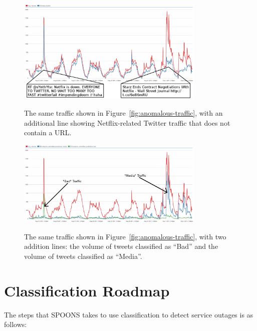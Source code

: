 \documentclass[12pt]{ucthesis}
\newcommand{\captionfonts}{\small\bf\ssp}
\begin{document}
\begin{figure}
   \begin{center}
      \includegraphics[width=0.8\textwidth]{images/Linkless_Differentiation.eps}
      \captionfonts
      \caption[Linkless Anomalous Traffic]{The same traffic shown in Figure~\ref{fig:anomalous-traffic}, with an additional line showing Netflix-related Twitter traffic that does not contain a URL.}
      \label{fig:linkless-traffic}
   \end{center}
\end{figure}

\begin{figure}
   \begin{center}
      \includegraphics[width=0.8\textwidth]{images/Classified_Traffic.eps}
      \captionfonts
      \caption[Classified Traffic]{The same traffic shown in Figure~\ref{fig:anomalous-traffic}, with two addition lines: the volume of tweets classified as ``Bad'' and the volume of tweets classified as ``Media''.}
      \label{fig:classified-traffic}
   \end{center}
\end{figure}

\chapter{Classification Roadmap}
\label{class-roadmap}
The steps that SPOONS takes to use classification to detect service outages is as follows:
\end{document}
